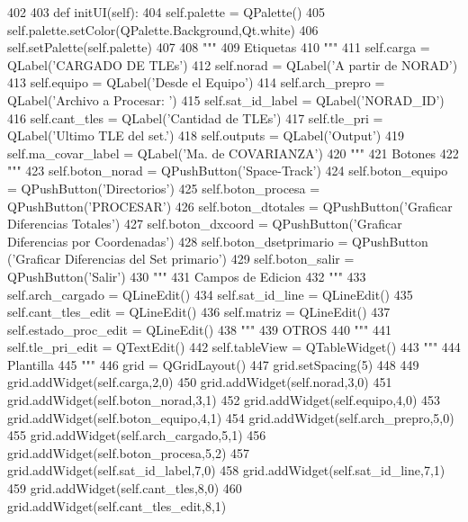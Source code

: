 \begin{DoxyCode}
402 
403     def initUI(self):
404         self.palette = QPalette()
405         self.palette.setColor(QPalette.Background,Qt.white)
406         self.setPalette(self.palette)
407         
408         """
409         Etiquetas
410         """
411         self.carga           = QLabel('CARGADO DE TLEs')
412         self.norad           = QLabel('A partir de NORAD')  
413         self.equipo          = QLabel('Desde el Equipo')
414         self.arch_prepro     = QLabel('Archivo a Procesar: ')
415         self.sat_id_label    = QLabel('NORAD_ID')
416         self.cant_tles       = QLabel('Cantidad de TLEs')
417         self.tle_pri         = QLabel('Ultimo TLE del set.')
418         self.outputs         = QLabel('Output')
419         self.ma_covar_label  = QLabel('Ma. de COVARIANZA')
420         """
421         Botones
422         """
423         self.boton_norad        = QPushButton('Space-Track')
424         self.boton_equipo       = QPushButton('Directorios')
425         self.boton_procesa      = QPushButton('PROCESAR')
426         self.boton_dtotales     = QPushButton('Graficar Diferencias Totales')
427         self.boton_dxcoord      = QPushButton('Graficar Diferencias por
       Coordenadas')
428         self.boton_dsetprimario = QPushButton ('Graficar Diferencias del Set
       primario')
429         self.boton_salir        = QPushButton('Salir')
430         """
431         Campos de Edicion
432         """
433         self.arch_cargado       = QLineEdit()
434         self.sat_id_line        = QLineEdit()
435         self.cant_tles_edit     = QLineEdit()
436         self.matriz             = QLineEdit()
437         self.estado_proc_edit   = QLineEdit()
438         """
439         OTROS
440         """
441         self.tle_pri_edit    = QTextEdit()
442         self.tableView       = QTableWidget()
443         """
444         Plantilla
445         """
446         grid = QGridLayout()
447         grid.setSpacing(5)
448         
449         grid.addWidget(self.carga,2,0)
450         grid.addWidget(self.norad,3,0)
451         grid.addWidget(self.boton_norad,3,1)
452         grid.addWidget(self.equipo,4,0)
453         grid.addWidget(self.boton_equipo,4,1)
454         grid.addWidget(self.arch_prepro,5,0)
455         grid.addWidget(self.arch_cargado,5,1)
456         grid.addWidget(self.boton_procesa,5,2)
457         grid.addWidget(self.sat_id_label,7,0)
458         grid.addWidget(self.sat_id_line,7,1)
459         grid.addWidget(self.cant_tles,8,0)
460         grid.addWidget(self.cant_tles_edit,8,1)        

\end{DoxyCode}
